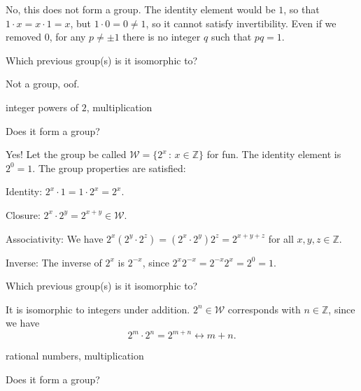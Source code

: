 \documentclass[../key.tex]{subfiles}
\begin{document}
\noindent No, this does not form a group. The identity element would be $1$, so that $1\cdot x = x\cdot 1 = x$, but $1\cdot 0 = 0\neq 1$, so it cannot satisfy invertibility. Even if we removed $0$, for any $p\neq \pm 1$ there is no integer $q$ such that $pq=1$.

\begin{iinner_problem}
\item Which previous group(s) is it isomorphic to?
\end{iinner_problem}

\noindent Not a group, oof.

\begin{inner_problem}
\item integer powers of $2$, multiplication
\end{inner_problem}

\begin{iinner_problem}[start=1]
\item Does it form a group?
\end{iinner_problem}

\noindent Yes! Let the group be called $\mathcal{W}=\{2^x\, :\, x\in \mathbb{Z}\}$ for fun. The identity element is $2^0=1$. The group properties are satisfied:

Identity: $2^x\cdot 1=1\cdot 2^x=2^x$.

Closure: $2^x\cdot 2^y = 2^{x+y} \in \mathcal{W}$.

Associativity: We have $2^{x}(2^{y}\cdot 2^{z})=(2^{x}\cdot 2^{y})2^{z}=2^{x+y+z}$ for all $x,y,z \in \mathbb{Z}$.

Inverse: The inverse of $2^x$ is $2^{-x}$, since $2^{x}2^{-x}=2^{-x}2^{x}=2^0=1$.

\begin{iinner_problem}
\item Which previous group(s) is it isomorphic to?
\end{iinner_problem}

\noindent It is isomorphic to integers under addition. $2^n\in \mathcal{W}$ corresponds with $n\in \mathbb{Z}$, since we have $$2^m\cdot 2^n=2^{m+n}\leftrightarrow m+n.$$

\begin{inner_problem}
\item rational numbers, multiplication
\end{inner_problem}

\begin{iinner_problem}[start=1]
\item Does it form a group?
\end{iinner_problem}
\end{document}
